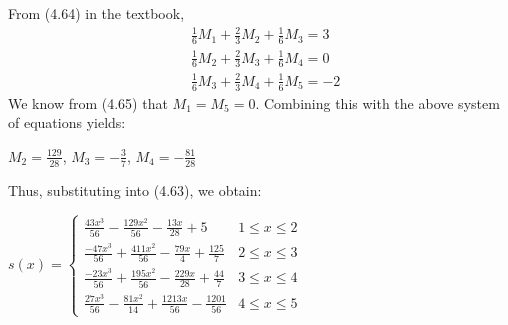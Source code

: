 \documentclass[12pt]{article}
\newenvironment{problem}[2][Problem]{\begin{trivlist}
\item[\hskip \labelsep {\bfseries #1}\hskip \labelsep {\bfseries #2.}]}{\end{trivlist}}
\begin{document}
\noindent From (4.64) in the textbook,
\begin{align*}
&\frac{1}{6}M_1 + \frac{2}{3}M_2 + \frac{1}{6}M_3 = 3\\
&\frac{1}{6}M_2 + \frac{2}{3}M_3 + \frac{1}{6}M_4 = 0\\
&\frac{1}{6}M_3 + \frac{2}{3}M_4 + \frac{1}{6}M_5 = -2
\end{align*}
\newpage
\noindent We know from (4.65) that $M_1 = M_5 = 0$. Combining this with the above system of equations yields:
\begin{center}
$M_2 = \frac{129}{28}$, $M_3 = -\frac{3}{7}$, $M_4 = -\frac{81}{28}$
\end{center}
Thus, substituting into (4.63), we obtain:
\begin{center}
$s(x) = \begin{cases} 
      \frac{43x^3}{56} - \frac{129x^2}{56} - \frac{13x}{28} + 5 & 1 \leq x \leq 2 \\
      \frac{-47x^3}{56} + \frac{411x^2}{56} - \frac{79x}{4} + \frac{125}{7} & 2 \leq x \leq 3 \\
      \frac{-23x^3}{56} + \frac{195x^2}{56} - \frac{229x}{28} + \frac{44}{7} & 3 \leq x \leq 4\\
      \frac{27x^3}{56} - \frac{81x^2}{14} + \frac{1213x}{56} - \frac{1201}{56} & 4 \leq x \leq 5
   \end{cases}
$
\end{center}

\begin{problem}{5}
\end{problem}
\end{document}
